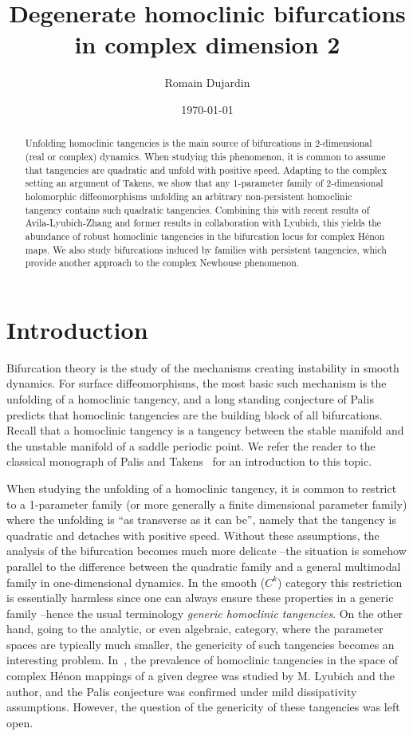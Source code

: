 \documentclass[11pt, oneside]{amsart}
\date{\today}
\title{Degenerate homoclinic bifurcations in   complex dimension 2}
\author{Romain Dujardin}
\theoremstyle{remark}
\theoremstyle{definition}
\theoremstyle{theorem}
\begin{document}
\begin{abstract}
Unfolding homoclinic tangencies is the main source of bifurcations in 2-dimensional (real or complex) dynamics. When studying this phenomenon, it is common to assume that tangencies are quadratic and unfold with positive speed. Adapting to the complex setting an argument of Takens, we show that  any 1-parameter family of 2-dimensional holomorphic diffeomorphisms unfolding an arbitrary non-persistent 
homoclinic  tangency contains such quadratic tangencies. Combining this with  recent  
results of Avila-Lyubich-Zhang and former results in collaboration with Lyubich, this yields the abundance of robust homoclinic tangencies in the bifurcation locus for complex Hénon maps. We also study bifurcations induced by families with persistent tangencies, which provide another approach to the complex Newhouse phenomenon.
\end{abstract}


 \maketitle 
 
 \setcounter{tocdepth}{1}
 \tableofcontents
 
\section{Introduction}

Bifurcation theory is the study of the mechanisms creating instability in smooth dynamics. For 
surface diffeomorphisms, the most basic such mechanism is the unfolding of a homoclinic tangency, and a long standing conjecture of Palis predicts that  homoclinic tangencies are the building block  of 
all bifurcations. Recall that a homoclinic tangency is a tangency between the stable manifold and the unstable manifold of a saddle periodic point.
We refer the reader to the  classical monograph of Palis and Takens~\cite{palis-takens}
for an introduction to this topic. 

When studying the unfolding of a homoclinic tangency, 
it is common to restrict to a 1-parameter  family (or more generally a finite dimensional parameter family) where the unfolding is ``as transverse as it can be'', namely that 
the tangency is quadratic and  detaches  with positive speed. Without these assumptions, the 
  analysis of the bifurcation becomes much more delicate --the situation is somehow parallel to the difference between the quadratic family and a general multimodal family in one-dimensional dynamics. 
In the smooth ($C^k$) category this restriction is essentially harmless since one can always ensure 
these properties  in a generic family --hence the usual terminology 
\emph{generic homoclinic tangencies}. On the other hand, 
going to the analytic, or even algebraic, category, 
where the parameter spaces are typically much smaller, the genericity of such tangencies becomes 
an interesting problem. In~\cite{tangencies}, the prevalence of homoclinic tangencies in the space of complex Hénon mappings of a given degree was studied by M. Lyubich and the author, and the Palis conjecture was confirmed under mild dissipativity assumptions. 
However, the question of the genericity of these tangencies was left open.  
\end{document}
